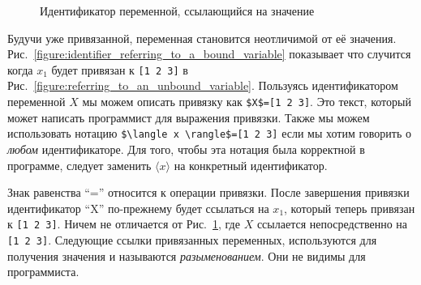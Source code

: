 \begin{figure}
\caption{Идентификатор переменной, ссылающийся на значение}
\label{figure:variable_identifier_referring_to_a_variable}
\end{figure}

Будучи уже привязанной, переменная становится неотличимой от её значения. Рис.~\ref{figure:identifier_referring_to_a_bound_variable} показывает что случится когда $x_{1}$ будет привязан к \lstinline|[1 2 3]| в Рис.~\ref{figure:referring_to_an_unbound_variable}. Пользуясь идентификатором переменной $X$ мы можем описать привязку как \lstinline|$X$=[1 2 3]|. Это текст, который может написать программист для выражения привязки. Также мы можем использовать нотацию \lstinline|$\langle x \rangle$=[1 2 3]| если мы хотим говорить о \emph{любом} идентификаторе. Для того, чтобы эта нотация была корректной в программе, следует заменить $\langle x \rangle$ на конкретный идентификатор.

Знак равенства ``='' относится к операции привязки. После завершения привязки идентификатор ``X'' по-прежнему будет ссылаться на $x_{1}$, который теперь привязан к \lstinline|[1 2 3]|. Ничем не отличается от Рис.~\ref{figure:variable_identifier_referring_to_a_variable}, где $X$ ссылается непосредственно на \lstinline|[1 2 3]|. Следующие ссылки привязанных переменных, используются для получения значения и называются \emph{разыменованием}. Они не видимы для программиста.

